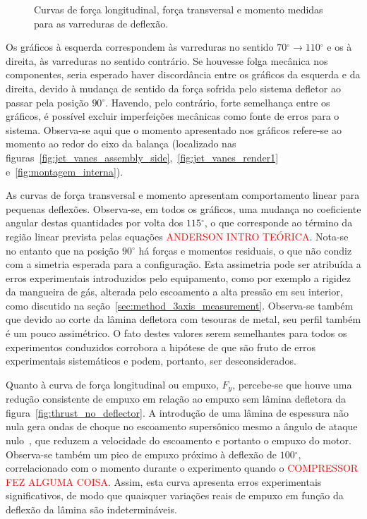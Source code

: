 \begin{figure}[htbp]
\begin{subfigure}{0.49\textwidth}
    \end{subfigure}
    \caption{Curvas de força longitudinal, força transversal e momento medidas para as varreduras de deflexão.}\label{fig:deflection_forces}
\end{figure}

Os gráficos à esquerda correspondem às varreduras no sentido \(70\mathrm{^{\circ}} \rightarrow 110\mathrm{^\circ}\) e os à direita, às varreduras no sentido contrário. Se houvesse folga mecânica nos componentes, seria esperado haver discordância entre os gráficos da esquerda e da direita, devido à mudança de sentido da força sofrida pelo sistema defletor ao passar pela posição \(90\mathrm{^{\circ}}\). Havendo, pelo contrário, forte semelhança entre os gráficos, é possível excluir imperfeições mecânicas como fonte de erros para o sistema. Observa-se aqui que o momento apresentado nos gráficos refere-se ao momento ao redor do eixo da balança (localizado nas figuras~\ref{fig:jet_vanes_assembly_side},~\ref{fig:jet_vanes_render1} e~\ref{fig:montagem_interna}).

As curvas de força transversal e momento apresentam comportamento linear para pequenas deflexões. Observa-se, em todos os gráficos, uma mudança no coeficiente angular destas quantidades por volta dos \(115\mathrm{^{\circ}}\), o que corresponde ao término da região linear prevista pelas equações \textcolor{red}{ANDERSON INTRO TEÓRICA}. Nota-se no entanto que na posição \(90\mathrm{^\circ}\) há forças e momentos residuais, o que não condiz com a simetria esperada para a configuração. Esta assimetria pode ser atribuída a erros experimentais introduzidos pelo equipamento, como por exemplo a rigidez da mangueira de gás, alterada pelo escoamento a alta pressão em seu interior, como discutido na seção~\ref{sec:method_3axis_measurement}. Observa-se também que devido ao corte da lâmina defletora com tesouras de metal, seu perfil também é um pouco assimétrico. O fato destes valores serem semelhantes para todos os experimentos conduzidos corrobora a hipótese de que são fruto de erros experimentais sistemáticos e podem, portanto, ser desconsiderados.

Quanto à curva de força longitudinal ou empuxo, \(F_y\), percebe-se que houve uma redução consistente de empuxo em relação ao empuxo sem lâmina defletora da figura~\ref{fig:thrust_no_deflector}. A introdução de uma lâmina de espessura não nula gera ondas de choque no escoamento supersônico mesmo a ângulo de ataque nulo~\cite{anderson}, que reduzem a velocidade do escoamento e portanto o empuxo do motor. Observa-se também um pico de empuxo próximo à deflexão de \(100\mathrm{^\circ}\), correlacionado com o momento durante o experimento quando o \textcolor{red}{COMPRESSOR FEZ ALGUMA COISA}\@. Assim, esta curva apresenta erros experimentais significativos, de modo que quaisquer variações reais de empuxo em função da deflexão da lâmina são indetermináveis.


